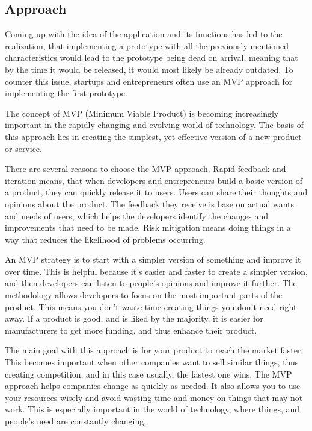 \subsection{Approach}

Coming up with the idea of the application and its functions has led to the realization, that implementing a prototype with all the previously mentioned characteristics would lead to the prototype being dead on arrival, meaning that by the time it would be released, it would most likely be already outdated. To counter this issue, startups and entrepreneurs often use an MVP approach for implementing the first prototype. 

The concept of MVP (Minimum Viable Product) is becoming increasingly important in the rapidly changing and evolving world of technology. The basis of this approach lies in creating the simplest, yet effective version of a new product or service.

There are several reasons to choose the MVP approach.
Rapid feedback and iteration means, that when developers and entrepreneurs build a basic version of a product, they can quickly release it to users. Users can  share their thoughts and opinions about the product. The feedback they receive is base on actual wants and needs of users, which helps the developers identify the changes and improvements that need to be made. Risk mitigation means doing things in a way that reduces the likelihood of problems occurring. 
 
An MVP strategy is to start with a simpler version of something and improve it  over time. This is helpful because it's easier and faster to create a simpler version, and then  developers can listen to people's opinions and improve it further. The methodology allows developers to focus on the most important parts of the product. This means you don't waste time creating things you don't need right away. If a product is good, and is liked by the majority, it is easier for manufacturers to get more funding, and thus enhance their product.
 
The main goal with this approach is for your product to reach the market faster. This becomes important when other companies want to sell similar things, thus creating competition, and in this case usually, the fastest one wins. The MVP approach helps companies change as quickly as needed. It also allows you to use your resources wisely and avoid wasting time and money on things that may not work. This is especially important in the world of technology, where things, and people's need are constantly changing.
\newline\cite{mvp}

